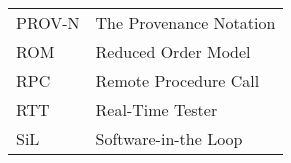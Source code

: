\begin{longtable}{ll}
PROV-N  &The Provenance Notation\\
ROM & Reduced Order Model\\
RPC     &Remote Procedure Call\\
RTT & Real-Time Tester\\
SiL	& Software-in-the Loop\\

\end{longtable}
